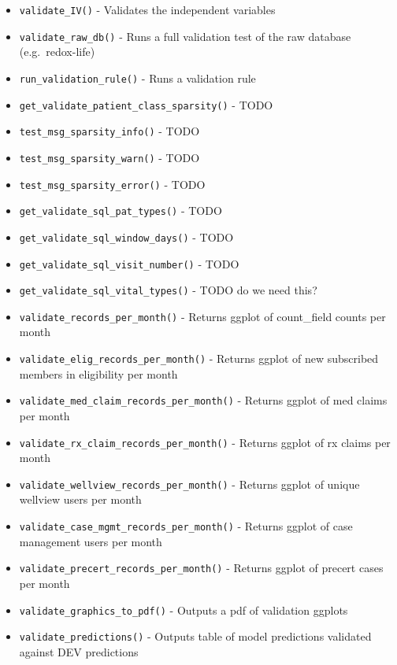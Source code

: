 \documentclass[
]{book}
\providecommand{\tightlist}{%
  \setlength{\itemsep}{0pt}\setlength{\parskip}{0pt}}
\begin{document}
\begin{itemize}
\tightlist
\item
  \texttt{validate\_IV()} - Validates the independent variables
\item
  \texttt{validate\_raw\_db()} - Runs a full validation test of the raw database (e.g.~redox-life)
\item
  \texttt{run\_validation\_rule()} - Runs a validation rule
\item
  \texttt{get\_validate\_patient\_class\_sparsity()} - TODO
\item
  \texttt{test\_msg\_sparsity\_info()} - TODO
\item
  \texttt{test\_msg\_sparsity\_warn()} - TODO
\item
  \texttt{test\_msg\_sparsity\_error()} - TODO
\item
  \texttt{get\_validate\_sql\_pat\_types()} - TODO
\item
  \texttt{get\_validate\_sql\_window\_days()} - TODO
\item
  \texttt{get\_validate\_sql\_visit\_number()} - TODO
\item
  \texttt{get\_validate\_sql\_vital\_types()} - TODO do we need this?
\item
  \texttt{validate\_records\_per\_month()} - Returns ggplot of count\_field counts per month
\item
  \texttt{validate\_elig\_records\_per\_month()} - Returns ggplot of new subscribed members in eligibility per month
\item
  \texttt{validate\_med\_claim\_records\_per\_month()} - Returns ggplot of med claims per month
\item
  \texttt{validate\_rx\_claim\_records\_per\_month()} - Returns ggplot of rx claims per month
\item
  \texttt{validate\_wellview\_records\_per\_month()} - Returns ggplot of unique wellview users per month
\item
  \texttt{validate\_case\_mgmt\_records\_per\_month()} - Returns ggplot of case management users per month
\item
  \texttt{validate\_precert\_records\_per\_month()} - Returns ggplot of precert cases per month
\item
  \texttt{validate\_graphics\_to\_pdf()} - Outputs a pdf of validation ggplots
\item
  \texttt{validate\_predictions()} - Outputs table of model predictions validated against DEV predictions
\end{itemize}
\end{document}
